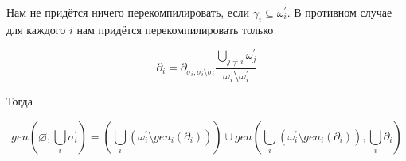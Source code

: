 Нам не придётся ничего перекомпилировать, если $\gamma_i \subseteq \omega_i^\prime$. В противном случае для каждого $i$ нам придётся перекомпилировать только

$$\partial_i = \partial_{\sigma_i, \sigma_i\setminus\sigma_i^\prime} \dfrac{\bigcup\limits_{j \neq i} \omega_j^\prime}{\omega_i \setminus \omega_i^\prime}$$

Тогда

$$gen(\varnothing, \bigcup\limits_i \sigma_i^\prime) = \left( \bigcup\limits_i (\omega_i^\prime \setminus gen_i(\partial_i)) \right) \cup gen(\bigcup\limits_i (\omega_i^\prime \setminus gen_i(\partial_i)), \bigcup\limits_i \partial_i)$$

